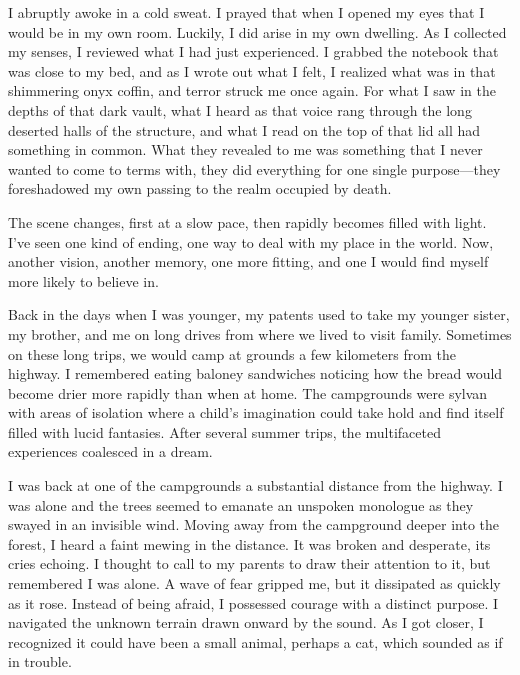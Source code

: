 I abruptly awoke in a cold sweat. I prayed that when I opened my eyes
that I would be in my own room. Luckily, I did arise in my own dwelling.
As I collected my senses, I reviewed what I had just experienced. I
grabbed the notebook that was close to my bed, and as I wrote out what I
felt, I realized what was in that shimmering onyx coffin, and terror
struck me once again. For what I saw in the depths of that dark vault,
what I heard as that voice rang through the long deserted halls of the
structure, and what I read on the top of that lid all had something in
common. What they revealed to me was something that I never wanted to
come to terms with, they did everything for one single purpose---they
foreshadowed my own passing to the realm occupied by death.

The scene changes, first at a slow pace, then rapidly becomes filled
with light. I've seen one kind of ending, one way to deal with my place
in the world. Now, another vision, another memory, one more fitting, and
one I would find myself more likely to believe in.

Back in the days when I was younger, my patents used to take my younger
sister, my brother, and me on long drives from where we lived to visit
family. Sometimes on these long trips, we would camp at grounds a few
kilometers from the highway. I remembered eating baloney sandwiches
noticing how the bread would become drier more rapidly than when at
home. The campgrounds were sylvan with areas of isolation where a
child's imagination could take hold and find itself filled with lucid
fantasies. After several summer trips, the multifaceted experiences
coalesced in a dream.

I was back at one of the campgrounds a substantial distance from the
highway. I was alone and the trees seemed to emanate an unspoken
monologue as they swayed in an invisible wind. Moving away from the
campground deeper into the forest, I heard a faint mewing in the
distance. It was broken and desperate, its cries echoing. I thought to
call to my parents to draw their attention to it, but remembered I was
alone. A wave of fear gripped me, but it dissipated as quickly as it
rose. Instead of being afraid, I possessed courage with a distinct
purpose. I navigated the unknown terrain drawn onward by the sound. As I
got closer, I recognized it could have been a small animal, perhaps a
cat, which sounded as if in trouble.

